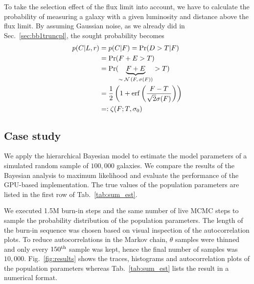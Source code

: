 To take the selection effect of the flux limit into account, we have to calculate the probability of measuring a galaxy with a given luminosity and distance above the flux limit.
By assuming Gaussian noise, as we already did in Sec.~\ref{sec:bb1truncpl}, the sought probability becomes
\begin{align}
p(C | L, r) &= p(C | F) = \Pr(D>T | F)\\
&= \Pr(F+E>T)\\
&=\Pr(\underbrace{F + E}_\text{$\sim \mathcal{N}\left(F,\sigma(F)\right)$} > T)\\
&=\frac{1}{2}\left( 1 + \operatorname{erf}\left( \frac{F - T}{\sqrt{2}\sigma(F)} \right) \right)\\
&=:\zeta(F ; T,\sigma_0)
\label{eq:pclr}
\end{align}
\fi


\subsection{Case study}


We apply the hierarchical Bayesian model to estimate the model parameters of a simulated random sample of $100{,}000$ galaxies.
We compare the results of the Bayesian analysis to maximum likelihood and evaluate the performance of the GPU-based implementation.
The true values of the population parameters are listed in the first row of Tab.~\ref{tab:sum_est}.

We executed 1.5M burn-in steps and the same number of live MCMC steps to sample the probability distribution of the population parameters.
The length of the burn-in sequence was chosen based on visual inspection of the autocorrelation plots.
To reduce autocorrelations in the Markov chain, $\theta$ samples were thinned and only every $150^\textnormal{th}$ sample was kept, hence the final number of samples was $10{,}000$.
Fig.~\ref{fig:results} shows the traces, histograms and autocorrelation plots of the population parameters whereas Tab.~\ref{tab:sum_est} lists the result in a numerical format.

